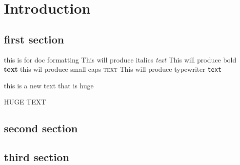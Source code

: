 \chapter{Introduction}

\section{ first section}

this is for doc formatting
This will produce italics \textit{text}
This will produce bold \textbf{text}
this wil produce small caps \textsc{text}
This will produce typewriter \texttt{text}

this is a new text that is huge \begin{Huge}
    HUGE TEXT
\end{Huge}

\section{second section}

\section{third section}
